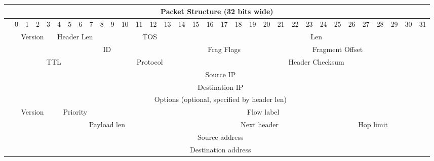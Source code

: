 \documentclass{article}
\begin{document}
\begin{tabular}{|c||c|c|c|c|c|c|c|c||c|c|c|c|c|c|c|c||c|c|c|c|c|c|c|c||c|c|c|c|c|c|c|c|}
\hline
	\multicolumn{33}{|c|}{\textbf{Packet Structure (32 bits wide)}}\\
\hline
	& 0 & 1 & 2 & 3 & 4 & 5 & 6 & 7 & 8 & 9 & 10 & 11 & 12 & 13 & 14 & 15 & 16 & 17 & 18 & 19 & 20 & 21 & 22 & 23 & 24 & 25 & 26 & 27 & 28 & 29 & 30 & 31\\
\hline
\hline
	\multirow{6}{*}{\rotatebox{90}{\textbf{IPv4}}}
		& \multicolumn{4}{|c|}{Version} & \multicolumn{4}{|c|}{Header Len} & \multicolumn{8}{|c|}{TOS} & \multicolumn{16}{|c|}{Len}\\
		\cline{2-33}
		& \multicolumn{16}{|c|}{ID} & \multicolumn{3}{|c|}{Frag Flags} & \multicolumn{13}{|c|}{Fragment Offset}\\
		\cline{2-33}
		& \multicolumn{8}{|c|}{TTL} & \multicolumn{8}{|c|}{Protocol} & \multicolumn{16}{|c|}{Header Checksum}\\
		\cline{2-33}
		& \multicolumn{32}{|c|}{Source IP}\\
		\cline{2-33}
		& \multicolumn{32}{|c|}{Destination IP}\\
		\cline{2-33}
		& \multicolumn{32}{|c|}{Options (optional, specified by header len)}\\
\hline
\hline
	\multirow{10}{*}{\rotatebox{90}{\textbf{IPv6}}}
		& \multicolumn{4}{|c|}{Version} & \multicolumn{4}{|c|}{Priority} & \multicolumn{24}{|c|}{Flow label}\\
		\cline{2-33}
		& \multicolumn{16}{|c|}{Payload len} & \multicolumn{8}{|c|}{Next header} & \multicolumn{8}{|c|}{Hop limit}\\
		\cline{2-33}
		& \multicolumn{32}{|c|}{\multirow{4}{*}{Source address}}\\
		& \multicolumn{32}{|c|}{}\\
		& \multicolumn{32}{|c|}{}\\
		& \multicolumn{32}{|c|}{}\\
		\cline{2-33}
		& \multicolumn{32}{|c|}{\multirow{4}{*}{Destination address}}\\
		& \multicolumn{32}{|c|}{}\\
		& \multicolumn{32}{|c|}{}\\
		& \multicolumn{32}{|c|}{}\\
\hline
\end{tabular}
\end{document}
